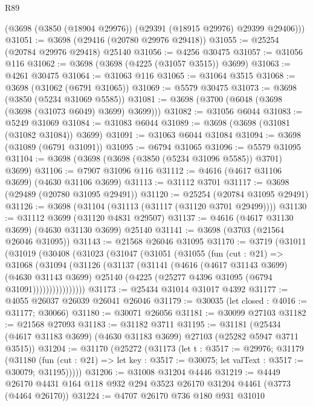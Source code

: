 \begin{lexlean}{R89}
\begin{coremodule}
      (@3698 (@3850 (@18904 @29976)) (@29391 (@18915 @29976) @29399 @29406)))
@31051 := @3698 (@29416 (@20780 @29976 @29418))
@31055 := @25254 (@20784 @29976 @29418) @25140
@31056 := @4256 @30475
@31057 := @31056 @116
@31062 := @3698 (@3698 (@4225 (@31057 @3515)) @3699)
@31063 := @4261 @30475
@31064 := @31063 @116
@31065 := @31064 @3515
@31068 := @3698 (@31062 (@6791 @31065))
@31069 := @5579 @30475
@31073 := @3698 (@3850 (@5234 @31069 @5585))
@31081 := @3698 (@3700 (@6048 (@3698 (@3698 (@31073 @6049) @3699) @3699)))
@31082 := @31056 @6044
@31083 := @5249 @31069
@31084 := @31083 @6044
@31089 := @3698 (@3698 (@31081 (@31082 @31084)) @3699)
@31091 := @31063 @6044 @31084
@31094 := @3698 (@31089 (@6791 @31091))
@31095 := @6794 @31065
@31096 := @5579 @31095
@31104 := @3698 (@3698 (@3698 (@3850 (@5234 @31096 @5585)) @3701) @3699)
@31106 := @7907 @31096 @116
@31112 := @4616 (@4617 @31106 @3699) (@4630 @31106 @3699)
@31113 := @31112 @3701
@31117 := @3698 (@29489 (@20780 @31095 @29491))
@31120 := @25254 (@20784 @31095 @29491)
@31126 := @3698 (@31104 (@31113 (@31117 (@31120 @3701 @29499))))
@31130 := @31112 @3699 (@31120 @4831 @29507)
@31137 := @4616 (@4617 @31130 @3699) (@4630 @31130 @3699) @25140
@31141 := @3698 (@3703 (@21564 @26046 @31095))
@31143 := @21568 @26046 @31095
@31170 := @3719
    (@31011
      (@31019
        (@30408
          (@31023
            (@31047
              (@31051
                (@31055
                  (fun (cut : @21) =>
                  @31068
                    (@31094
                      (@31126
                        (@31137
                          (@31141
                            (@4616
                              (@4617 @31143 @3699)
                              (@4630 @31143 @3699)
                              @25140
                              (@4225 (@25277 @4396 @31095 (@6794 @31091))))))))))))))))
@31173 := @25434 @31014 @31017 @4392
@31177 := @4055 @26037 @26039 @26041 @26046
@31179 := @30035 (let closed : @4016 := @31177; @30066)
@31180 := @30071 @26056
@31181 := @30099 @27103
@31182 := @21568 @27093
@31183 := @31182 @3711
@31195 := @31181
    (@25434 (@4617 @31183 @3699) (@4630 @31183 @3699) @27103 (@25282 @5947 @3711 @3515))
@31204 := @31170
    (@25272
      (@31173
        (let t : @3517 := @29976;
        @31179
          (@31180
            (fun (cut : @21) =>
            let key : @3517 := @30075; let valText : @3517 := @30079; @31195)))))
@31206 := @31008 @31204 @4446
@31219 := @4449 @26170 @4431 @164 @118 @932 @294 @3523 @26170 @31204 @4461 (@3773 (@4464 @26170))
@31224 := @4707 @26170 @736 @180 @931 @31010

\end{coremodule}
\end{lexlean}
